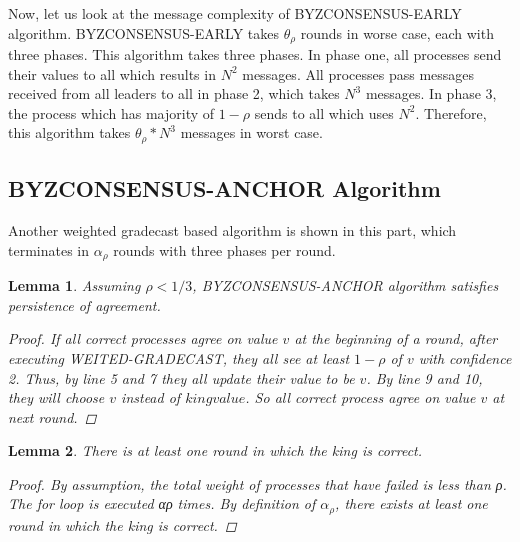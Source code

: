 \documentclass[conference]{IEEEtran}
\newtheorem{l1}{Lemma}
\begin{document}
Now, let us look at the message complexity of BYZCONSENSUS-EARLY algorithm. BYZCONSENSUS-EARLY takes $\theta_\rho$ rounds in worse case, each with three phases.  This algorithm takes three phases. In phase one, all processes send their values to all which results in $N^2$ messages. All processes pass messages received from all leaders to all in phase 2, which takes $N^3$ messages. In phase 3, the process which has majority of $1 - \rho$ sends to all which uses $N^2$. Therefore, this algorithm takes  $\theta_\rho*N^3$ messages in worst case. 

\subsection{BYZCONSENSUS-ANCHOR Algorithm}
Another weighted gradecast based algorithm is shown in this part, which terminates in $\alpha_\rho$ rounds with three phases per round. 

\begin{l1} 
Assuming $\rho < 1/3$, BYZCONSENSUS-ANCHOR algorithm satisfies persistence of agreement.
\begin{proof}
If all correct processes agree on value $v$ at the beginning of a round, after executing WEITED-GRADECAST, they all see at least $1 - \rho$ of $v$ with confidence 2. Thus,  by line  5 and 7 they all update their value to be $v$. By line 9 and 10, they will choose $v$ instead of $kingvalue$. So all correct process agree on value $v$ at next round.  
\end{proof}
\end{l1}

\begin{l1}
There is at least one round in which the king is correct.
\begin{proof}
By assumption, the total weight of processes that
have failed is less than ρ. The for loop is executed αρ times.
By definition of $\alpha_\rho$, there exists at least one round in which
the king is correct.
\end{proof}
\end{l1}
\end{document}
